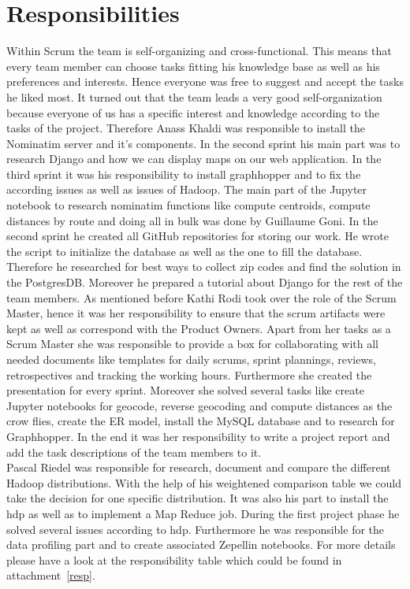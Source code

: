 
\section{Responsibilities}

Within Scrum the team is self-organizing and cross-functional. This means that every
team member can choose tasks fitting his knowledge base as well as his preferences
and interests. Hence everyone was free to suggest and accept the tasks he liked
most.
It turned out that the team leads a very good self-organization because
everyone of us has a specific interest and knowledge according to the tasks of
the project.
Therefore Anass Khaldi was responsible to install the Nominatim server
and it's components. In the second sprint his main part was to research Django
and how we can display maps on our web application. In the third sprint it was
his responsibility to install graphhopper and to fix the according issues as well
as issues of Hadoop.
The main part of the Jupyter notebook to research nominatim functions like compute
centroids, compute distances by route and doing all in bulk was done by Guillaume
Goni. In the second sprint he created all GitHub repositories for storing our work.
He wrote the script to initialize the database as well as the one to fill the database.
Therefore he researched for best ways to collect zip codes and find the solution
in the PostgresDB. Moreover he prepared a tutorial about Django for the rest of
the team members.
As mentioned before Kathi Rodi took over the role of the Scrum Master, hence it
was her responsibility to ensure that the scrum artifacts were kept as well as
correspond with the Product Owners. Apart from her tasks as a Scrum Master she
was responsible to provide a box for collaborating with all needed documents like
templates for daily scrums, sprint plannings, reviews, retrospectives and tracking
the working hours. Furthermore she created the presentation for every sprint.
Moreover she solved several tasks like create Jupyter notebooks for geocode,
reverse geocoding and compute distances as the crow flies, create the ER model,
install the MySQL database and to research for Graphhopper.
In the end it was her responsibility to write a project report and add the task 
descriptions of the team members to it.\\Pascal Riedel was responsible for research,
document and compare the different Hadoop distributions. With the help of his
weightened comparison table we could take the decision for one specific distribution.
It was also his part to install the \acs{hdp} as well as to implement a Map Reduce job.
During the first project phase he solved several issues according to \acs{hdp}.
Furthermore he was responsible for the data profiling part and to create associated
Zepellin notebooks.
For more details please have a look at the responsibility table which could be
found in attachment~\ref{resp}.
